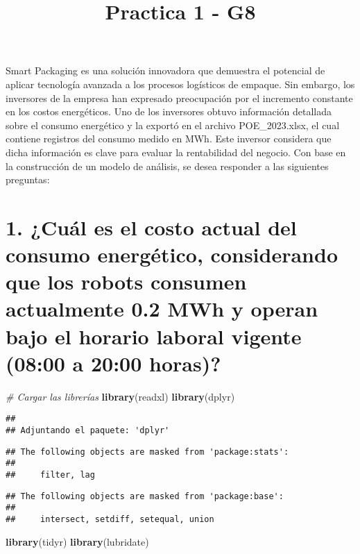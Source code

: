 \documentclass[
]{article}
\title{Practica 1 - G8}
\author{}
\date{\vspace{-2.5em}}
\newenvironment{Shaded}{\begin{snugshade}}{\end{snugshade}}
\newcommand{\CommentTok}[1]{\textcolor[rgb]{0.56,0.35,0.01}{\textit{#1}}}
\newcommand{\FunctionTok}[1]{\textcolor[rgb]{0.13,0.29,0.53}{\textbf{#1}}}
\newcommand{\NormalTok}[1]{#1}
\begin{document}
\maketitle

Smart Packaging es una solución innovadora que demuestra el potencial de
aplicar tecnología avanzada a los procesos logísticos de empaque. Sin
embargo, los inversores de la empresa han expresado preocupación por el
incremento constante en los costos energéticos. Uno de los inversores
obtuvo información detallada sobre el consumo energético y la exportó en
el archivo POE\_2023.xlsx, el cual contiene registros del consumo medido
en MWh. Este inversor considera que dicha información es clave para
evaluar la rentabilidad del negocio. Con base en la construcción de un
modelo de análisis, se desea responder a las siguientes preguntas:

\section{1. ¿Cuál es el costo actual del consumo energético,
considerando que los robots consumen actualmente 0.2 MWh y operan bajo
el horario laboral vigente (08:00 a 20:00
horas)?}\label{cuuxe1l-es-el-costo-actual-del-consumo-energuxe9tico-considerando-que-los-robots-consumen-actualmente-0.2-mwh-y-operan-bajo-el-horario-laboral-vigente-0800-a-2000-horas}

\begin{Shaded}
\begin{Highlighting}[]
\CommentTok{\# Cargar las librerías}
\FunctionTok{library}\NormalTok{(readxl)    }
\FunctionTok{library}\NormalTok{(dplyr)     }
\end{Highlighting}
\end{Shaded}

\begin{verbatim}
## 
## Adjuntando el paquete: 'dplyr'
\end{verbatim}

\begin{verbatim}
## The following objects are masked from 'package:stats':
## 
##     filter, lag
\end{verbatim}

\begin{verbatim}
## The following objects are masked from 'package:base':
## 
##     intersect, setdiff, setequal, union
\end{verbatim}

\begin{Shaded}
\begin{Highlighting}[]
\FunctionTok{library}\NormalTok{(tidyr)     }
\FunctionTok{library}\NormalTok{(lubridate) }
\end{Highlighting}
\end{Shaded}
\end{document}
